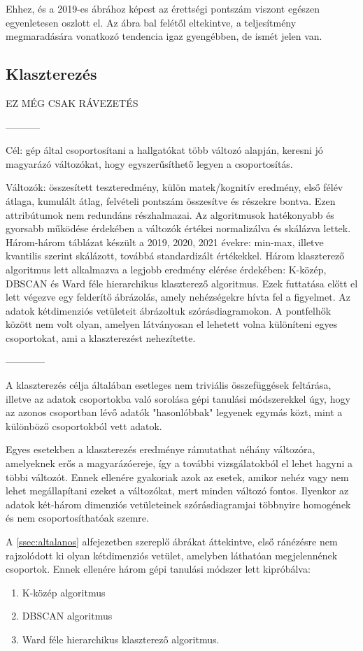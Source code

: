 \documentclass[12pt]{article}
\begin{document}
Ehhez, és a 2019-es ábrához képest az érettségi pontszám viszont egészen egyenletesen oszlott el. Az ábra bal felétől eltekintve, a teljesítmény megmaradására vonatkozó tendencia igaz gyengébben, de ismét jelen van.


\subsection{Klaszterezés}

EZ MÉG CSAK RÁVEZETÉS

-----------

Cél: gép által csoportosítani a hallgatókat több változó alapján, keresni jó magyarázó változókat, hogy egyszerűsíthető legyen a csoportosítás.

Változók: összesített teszteredmény, külön matek/kognitív eredmény, első félév átlaga, kumulált átlag, felvételi pontszám összesítve és részekre bontva. Ezen attribútumok nem redundáns részhalmazai.
	Az algoritmusok hatékonyabb és gyorsabb működése érdekében a változók értékei normalizálva és skálázva lettek. Három-három táblázat készült a 2019, 2020, 2021 évekre: min-max, illetve kvantilis szerint skálázott, továbbá standardizált értékekkel.
	Három klaszterező algoritmus lett alkalmazva a legjobb eredmény elérése érdekében: K-közép, DBSCAN és Ward féle hierarchikus klaszterező algoritmus.
	Ezek futtatása előtt el lett végezve egy felderítő ábrázolás, amely nehézségekre hívta fel a figyelmet. Az adatok kétdimenziós vetületeit ábrázoltuk szórásdiagramokon. A pontfelhők között nem volt olyan, amelyen látványosan el lehetett volna különíteni egyes csoportokat, ami a klaszterezést nehezítette.

------------

A klaszterezés célja általában esetleges nem triviális összefüggések feltárása, illetve az adatok csoportokba való sorolása gépi tanulási módszerekkel úgy, hogy az azonos csoportban lévő adatók "hasonlóbbak" legyenek egymás közt, mint a különböző csoportokból vett adatok.

Egyes esetekben a klaszterezés eredménye rámutathat néhány változóra, amelyeknek erős a magyarázóereje, így a további vizsgálatokból el lehet hagyni a többi változót. Ennek ellenére gyakoriak azok az esetek, amikor nehéz vagy nem lehet megállapítani ezeket a változókat, mert minden változó fontos. Ilyenkor az adatok két-három dimenziós vetületeinek szórásdiagramjai többnyire homogének és nem csoportosíthatóak szemre.

A \ref{ssec:altalanos} alfejezetben szereplő ábrákat áttekintve, első ránézésre nem rajzolódott ki olyan kétdimenziós vetület, amelyben láthatóan megjelennének csoportok. Ennek ellenére három gépi tanulási módszer lett kipróbálva:
\begin{enumerate}
\item K-közép algoritmus
\item DBSCAN algoritmus
\item Ward féle hierarchikus klaszterező algoritmus.
\end{enumerate}
\end{document}
